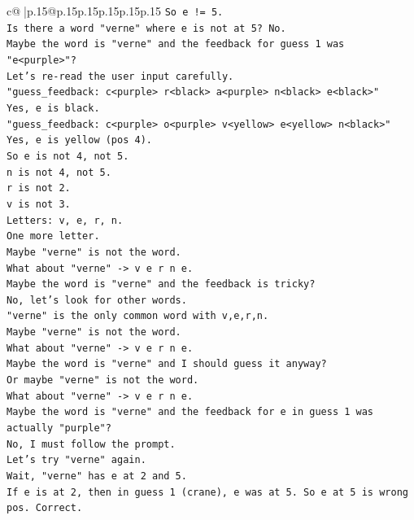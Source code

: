 \documentclass{article}
\begin{document}
{\begin{supertabular}{c@{$\;$}|p{.15\linewidth}@{}p{.15\linewidth}p{.15\linewidth}p{.15\linewidth}p{.15\linewidth}p{.15\linewidth}}
{{{\texttt{So e != 5.} \\
\texttt{Is there a word "verne" where e is not at 5? No.} \\
\texttt{Maybe the word is "verne" and the feedback for guess 1 was "e<purple>"?} \\
\texttt{Let's re{-}read the user input carefully.} \\
\texttt{"guess\_feedback: c<purple> r<black> a<purple> n<black> e<black>"} \\
\texttt{Yes, e is black.} \\
\texttt{"guess\_feedback: c<purple> o<purple> v<yellow> e<yellow> n<black>"} \\
\texttt{Yes, e is yellow (pos 4).} \\
\texttt{So e is not 4, not 5.} \\
\texttt{n is not 4, not 5.} \\
\texttt{r is not 2.} \\
\texttt{v is not 3.} \\
\texttt{Letters: v, e, r, n.} \\
\texttt{One more letter.} \\
\texttt{Maybe "verne" is not the word.} \\
\texttt{What about "verne" {-}> v e r n e.} \\
\texttt{Maybe the word is "verne" and the feedback is tricky?} \\
\texttt{No, let's look for other words.} \\
\texttt{"verne" is the only common word with v,e,r,n.} \\
\texttt{Maybe "verne" is not the word.} \\
\texttt{What about "verne" {-}> v e r n e.} \\
\texttt{Maybe the word is "verne" and I should guess it anyway?} \\
\texttt{Or maybe "verne" is not the word.} \\
\texttt{What about "verne" {-}> v e r n e.} \\
\texttt{Maybe the word is "verne" and the feedback for e in guess 1 was actually "purple"?} \\
\texttt{No, I must follow the prompt.} \\
\texttt{Let's try "verne" again.} \\
\texttt{Wait, "verne" has e at 2 and 5.} \\
\texttt{If e is at 2, then in guess 1 (crane), e was at 5. So e at 5 is wrong pos. Correct.} \\
}}}
\end{supertabular}}
\end{document}
